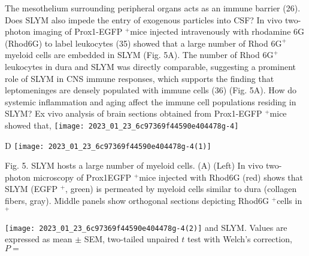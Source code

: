 The mesothelium surrounding peripheral organs acts as an immune barrier (26). Does SLYM also impede the entry of exogenous particles into CSF? In vivo two-photon imaging of Prox1-EGFP ${ }^{+}$mice injected intravenously with rhodamine $6 \mathrm{G}$ (Rhod6G) to label leukocytes (35) showed that a large number of Rhod $6 \mathrm{G}^{+}$myeloid cells are embedded in SLYM (Fig. 5A). The number of Rhod $6 \mathrm{G}^{+}$ leukocytes in dura and SLYM was directly comparable, suggesting a prominent role of SLYM in CNS immune responses, which supports the finding that leptomeninges are densely populated with immune cells (36) (Fig. 5A). How do systemic inflammation and aging affect the immune cell populations residing in SLYM? Ex vivo analysis of brain sections obtained from Prox1-EGFP ${ }^{+}$mice showed that,
\texttt{[image: 2023\_01\_23\_6c97369f44590e404478g-4]}

D
\texttt{[image: 2023\_01\_23\_6c97369f44590e404478g-4(1)]}

Fig. 5. SLYM hosts a large number of myeloid cells. (A) (Left) In vivo two-photon microscopy of Prox1EGFP $^{+}$mice injected with Rhod6G (red) shows that SLYM (EGFP ${ }^{+}$, green) is permeated by myeloid cells similar to dura (collagen fibers, gray). Middle panels show orthogonal sections depicting Rhod6G ${ }^{+}$cells in $^{+}$

\texttt{[image: 2023\_01\_23\_6c97369f44590e404478g-4(2)]}
and SLYM. Values are expressed as mean $\pm$ SEM, two-tailed unpaired $t$ test with Welch's correction, $P=$


